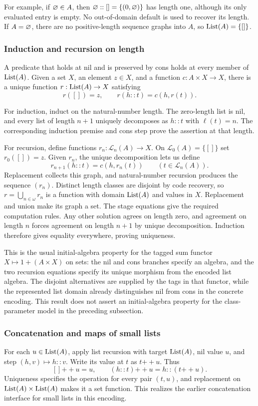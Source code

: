 For example, if $\varnothing\in A$, then
$\varnothing::[]=\{(0,\varnothing)\}$ has length one, although its
only evaluated entry is empty. No out-of-domain default is used to
recover its length. If $A=\varnothing$, there are no positive-length
sequence graphs into $A$, so $\mathrm{List}(A)=\{[]\}$.

\subsubsection{Induction and recursion on length}
\begin{theorem}
A predicate that holds at nil and is preserved by cons holds at every
member of $\mathrm{List}(A)$. Given a set $X$, an element $z\in X$, and a
function $c:A\times X\to X$, there is a unique function
$r:\mathrm{List}(A)\to X$ satisfying
\[
r([])=z,\qquad r(h::t)=c(h,r(t)).
\]
\end{theorem}
\Proof
For induction, induct on the natural-number length. The zero-length
list is nil, and every list of length $n+1$ uniquely decomposes as
$h::t$ with $\ell(t)=n$. The corresponding induction premise and
cons step prove the assertion at that length.

For recursion, define functions $r_n:\mathcal L_n(A)\to X$.
On $\mathcal L_0(A)=\{[]\}$ set $r_0([])=z$. Given $r_n$, the
unique decomposition lets us define
\[
r_{n+1}(h::t)=c(h,r_n(t))\qquad(t\in\mathcal L_n(A)).
\]
Replacement collects this graph, and natural-number recursion produces
the sequence $(r_n)$. Distinct length classes are disjoint by code
recovery, so $r=\bigcup_{n\in\omega}r_n$ is a function with domain
$\mathrm{List}(A)$ and values in $X$. Replacement and union make its graph
a set. The stage equations give the required computation rules.
Any other solution agrees on length zero, and agreement on length $n$
forces agreement on length $n+1$ by unique decomposition. Induction
therefore gives equality everywhere, proving uniqueness.
\Done

This is the usual initial-algebra property for the tagged sum functor
$X\mapsto 1+(A\times X)$ on sets: the nil and cons branches specify
an algebra, and the two recursion equations specify its unique morphism
from the encoded list algebra. The disjoint alternatives are supplied
by the tags in that functor, while the represented list domain already
distinguishes nil from cons in the concrete encoding. This result does
not assert an initial-algebra property for the class-parameter model
in the preceding subsection.

\subsubsection{Concatenation and maps of small lists}
For each $u\in\mathrm{List}(A)$, apply list recursion with target $\mathrm{List}(A)$,
nil value $u$, and step $(h,v)\mapsto h::v$. Write its value at $t$
as $t\mathbin{+\!\!+}u$. Thus
\[
[]\mathbin{+\!\!+}u=u,\qquad
(h::t)\mathbin{+\!\!+}u=h::(t\mathbin{+\!\!+}u).
\]
Uniqueness specifies the operation for every pair $(t,u)$, and replacement
on $\mathrm{List}(A)\times\mathrm{List}(A)$ makes it a set function. This realizes
the earlier concatenation interface for small lists in this encoding.

